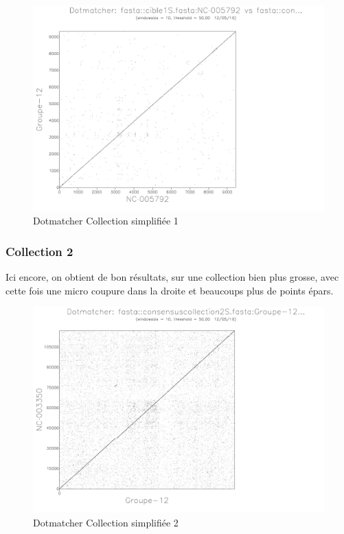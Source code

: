 \documentclass[a4paper]{article}
\begin{document}
\begin{figure}[H]
\includegraphics[scale=0.4]{1S}\caption{Dotmatcher Collection simplifiée 1}
\end{figure}



\subsubsection{Collection 2}

Ici encore, on obtient de bon résultats, sur une collection bien plus
grosse, avec cette fois une micro coupure dans la droite et beaucoups
plus de points épars.

\begin{figure}[H]
\includegraphics[scale=0.4]{2S}\caption{Dotmatcher Collection simplifiée 2}
\end{figure}
\end{document}

